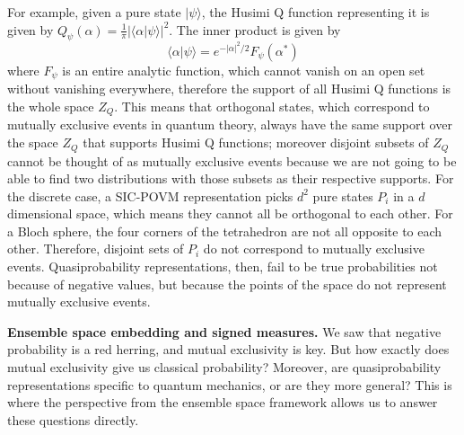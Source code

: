 \documentclass[10pt,twocolumn, nofootinbib]{revtex4-2}
\def\>{\rangle}
\begin{document}
For example, given a pure state $|\psi\>$, the Husimi Q function representing it is given by $Q_\psi(\alpha) = \frac{1}{\pi} |\langle \alpha | \psi \rangle|^2$. The inner product is given by \cite[eq. 11.7-1]{mandel1995}
\begin{equation}
	\langle \alpha | \psi \rangle = e^{-|\alpha|^2/2} F_\psi(\alpha^\ast)
\end{equation}
where $F_\psi$ is an entire analytic function, which cannot vanish on an open set without vanishing everywhere, therefore the support of all Husimi Q functions is the whole space $Z_Q$. This means that orthogonal states, which correspond to mutually exclusive events in quantum theory, always have the same support over the space $Z_Q$ that supports Husimi Q functions; moreover disjoint subsets of $Z_Q$ cannot be thought of as mutually exclusive events because we are not going to be able to find two distributions with those subsets as their respective supports. For the discrete case, a SIC-POVM representation picks $d^2$ pure states $P_i$ in a $d$ dimensional space, which means they cannot all be orthogonal to each other. For a Bloch sphere, the four corners of the tetrahedron are not all opposite to each other. Therefore, disjoint sets of $P_i$ do not correspond to mutually exclusive events. Quasiprobability representations, then, fail to be true probabilities not because of negative values, but because the points of the space do not represent mutually exclusive events.


\textbf{Ensemble space embedding and signed measures.} We saw that negative probability is a red herring, and mutual exclusivity is key. But how exactly does mutual exclusivity give us classical probability? Moreover, are quasiprobability representations specific to quantum mechanics, or are they more general? This is where the perspective from the ensemble space framework allows us to answer these questions directly.
\end{document}
